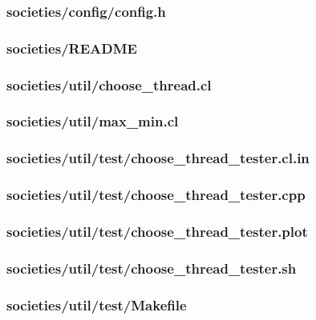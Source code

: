 \documentclass{article}
\begin{document}
\subsubsection*{societies/config/config.h}


\subsubsection*{societies/README}


\subsubsection*{societies/util/choose\_thread.cl}


\subsubsection*{societies/util/max\_min.cl}


\subsubsection*{societies/util/test/choose\_thread\_tester.cl.in}


\subsubsection*{societies/util/test/choose\_thread\_tester.cpp}


\subsubsection*{societies/util/test/choose\_thread\_tester.plot}


\subsubsection*{societies/util/test/choose\_thread\_tester.sh}


\subsubsection*{societies/util/test/Makefile}

\end{document}
